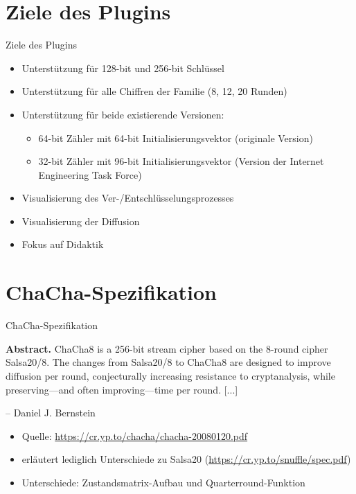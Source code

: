 \documentclass{beamer}
\begin{document}
\section{Ziele des Plugins}
\begin{frame}{Ziele des Plugins}
\begin{itemize}
\item Unterstützung für 128-bit und 256-bit Schlüssel
\item Unterstützung für alle Chiffren der Familie (8, 12, 20 Runden)
\item Unterstützung für beide existierende Versionen:
\begin{itemize}
\item 64-bit Zähler mit 64-bit Initialisierungsvektor (originale Version)
\item 32-bit Zähler mit 96-bit Initialisierungsvektor (Version der Internet Engineering Task Force)
\end{itemize}
\item Visualisierung des Ver-/Entschlüsselungsprozesses
\item Visualisierung der Diffusion
\item Fokus auf Didaktik
\end{itemize}
\end{frame}

\section{ChaCha-Spezifikation}
\begin{frame}{ChaCha-Spezifikation}

\begin{center}
\parbox{0.8\textwidth}{
\textbf{Abstract.} ChaCha8 is a 256-bit stream cipher based on the 8-round
cipher Salsa20/8. The changes from Salsa20/8 to ChaCha8 are designed
to improve diffusion per round, conjecturally increasing resistance to
cryptanalysis, while preserving—and often improving—time per round. [...]
\vspace{-0.75em}
\begin{flushright}
-- Daniel J. Bernstein
\end{flushright}
}
\end{center}
\begin{itemize}
\item Quelle: \url{https://cr.yp.to/chacha/chacha-20080120.pdf}
\item erläutert lediglich Unterschiede zu Salsa20 (\url{https://cr.yp.to/snuffle/spec.pdf})
\item Unterschiede: Zustandsmatrix-Aufbau und Quarterround-Funktion
\end{itemize}
\end{frame}
\end{document}
